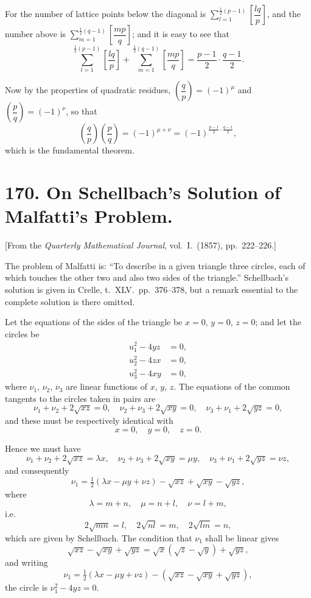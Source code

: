 \documentclass[11pt,a4paper]{article}
\theoremstyle{plain}
\begin{document}
For the number of lattice points below the diagonal is $\sum\limits_{l=1}^{\frac{1}{2}(p-1)} \left[\dfrac{lq}{p}\right]$, and the number above is $\sum\limits_{m=1}^{\frac{1}{2}(q-1)} \left[\dfrac{mp}{q}\right]$; and it is easy to see that
\[
\sum_{l=1}^{\frac{1}{2}(p-1)} \left[\frac{lq}{p}\right]
+ \sum_{m=1}^{\frac{1}{2}(q-1)} \left[\frac{mp}{q}\right]
= \frac{p-1}{2} \cdot \frac{q-1}{2}.
\]

Now by the properties of quadratic residues, $\left(\dfrac{q}{p}\right) = (-1)^{\mu}$ and $\left(\dfrac{p}{q}\right) = (-1)^{\nu}$, so that
\[
\left(\frac{q}{p}\right)\left(\frac{p}{q}\right) = (-1)^{\mu+\nu}
= (-1)^{\frac{p-1}{2}\cdot\frac{q-1}{2}},
\]
which is the fundamental theorem.


\newpage
\section*{170. On Schellbach's Solution of Malfatti's Problem.}

[From the \textit{Quarterly Mathematical Journal}, vol.~I.~(1857), pp.~222--226.]

The problem of Malfatti is: ``To describe in a given triangle three circles, each of which touches the other two and also two sides of the triangle.'' Schellbach's solution is given in Crelle, t.~XLV.~pp.~376--378, but a remark essential to the complete solution is there omitted.

Let the equations of the sides of the triangle be $x=0$, $y=0$, $z=0$; and let the circles be
\[
\begin{aligned}
u_1^2 - 4yz &= 0, \\
u_2^2 - 4zx &= 0, \\
u_3^2 - 4xy &= 0,
\end{aligned}
\]
where $\nu_1$, $\nu_2$, $\nu_3$ are linear functions of $x$, $y$, $z$. The equations of the common tangents to the circles taken in pairs are
\[
\nu_1 + \nu_2 + 2\sqrt{xz} = 0,\quad
\nu_2 + \nu_3 + 2\sqrt{xy} = 0,\quad
\nu_3 + \nu_1 + 2\sqrt{yz} = 0,
\]
and these must be respectively identical with
\[
x=0,\quad y=0,\quad z=0.
\]

Hence we must have
\[
\nu_1 + \nu_2 + 2\sqrt{xz} = \lambda x,\quad
\nu_2 + \nu_3 + 2\sqrt{xy} = \mu y,\quad
\nu_3 + \nu_1 + 2\sqrt{yz} = \nu z,
\]
and consequently
\[
\nu_1 = \tfrac{1}{2}(\lambda x - \mu y + \nu z) - \sqrt{xz} + \sqrt{xy} - \sqrt{yz},
\]
where
\[
\lambda = m+n,\quad \mu = n+l,\quad \nu = l+m,
\]
i.e.
\[
2\sqrt{mn} = l,\quad 2\sqrt{nl} = m,\quad 2\sqrt{lm} = n,
\]
which are given by Schellbach. The condition that $\nu_1$ shall be linear gives
\[
\sqrt{xz} - \sqrt{xy} + \sqrt{yz} = \sqrt{x}(\sqrt{z} - \sqrt{y}) + \sqrt{yz},
\]
and writing
\[
\nu_1 = \tfrac{1}{2}(\lambda x - \mu y + \nu z) - (\sqrt{xz} - \sqrt{xy} + \sqrt{yz}),
\]
the circle is $\nu_1^2 - 4yz = 0$.
\end{document}
